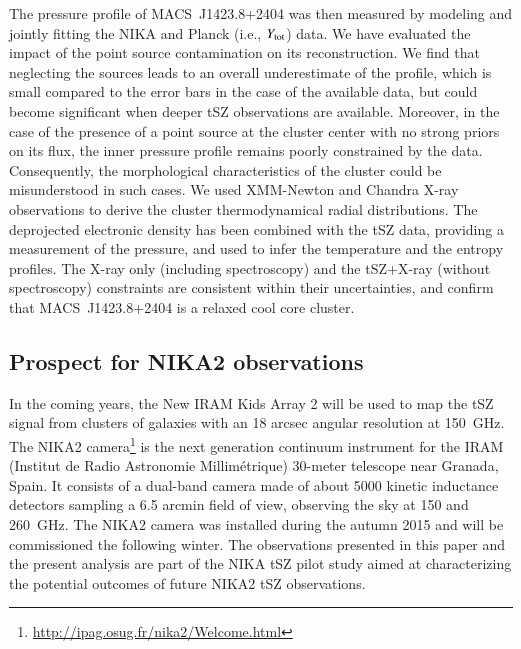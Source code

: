 \documentclass[traditabstract]{aa}
\begin{document}
The pressure profile of \mbox{MACS~J1423.8+2404} was then measured by modeling and jointly fitting the NIKA and Planck (i.e., $Y_{\rm tot}$) data. We have evaluated the impact of the point source contamination on its reconstruction. We find that neglecting the sources leads to an overall underestimate of the profile, which is small compared to the error bars in the case of the available data, but  could become significant when deeper tSZ observations are available. Moreover, in the case of the presence of a point source at the cluster center with no strong priors on its flux, the inner pressure profile remains poorly constrained by the data. Consequently, the morphological characteristics of the cluster could be misunderstood in such cases. We used XMM-Newton and Chandra X-ray observations to derive the cluster thermodynamical radial distributions. The deprojected electronic density has been combined with the tSZ data, providing a measurement of the pressure, and used to infer the temperature and the entropy profiles. The X-ray only (including spectroscopy) and the tSZ+X-ray (without spectroscopy) constraints are consistent within their uncertainties, and confirm that \mbox{MACS~J1423.8+2404} is a relaxed cool core cluster.

\subsection{Prospect for NIKA2 observations}
In the coming years, the New IRAM Kids Array 2 \citep[NIKA2][]{monfardini2014} will be used to map the tSZ signal from clusters of galaxies with an 18 arcsec angular resolution at 150~GHz. The NIKA2 camera\footnote{\url{http://ipag.osug.fr/nika2/Welcome.html}} is the next generation continuum instrument for the IRAM (Institut de Radio Astronomie Millim\'etrique) 30-meter telescope near Granada, Spain. It consists of a dual-band camera made of about 5000 kinetic inductance detectors sampling a 6.5 arcmin field of view, observing the sky at 150 and 260~GHz. The NIKA2 camera was installed during the autumn 2015 and will be commissioned  the following winter. The observations presented in this paper and the present analysis are part of the NIKA tSZ pilot study aimed at characterizing the potential outcomes of future NIKA2 tSZ observations.
\end{document}
